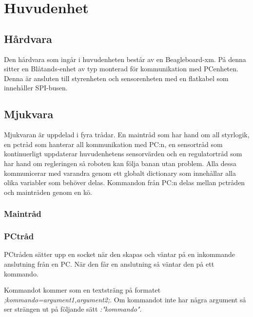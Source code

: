 
\section{Huvudenhet}


\subsection{Hårdvara}
Den hårdvara som ingår i huvudenheten består av en Beagleboard-xm. På denna sitter en Blåtands-enhet av typ  monterad för kommunikation med PCenheten. Denna är ansluten till styrenheten och sensorenheten med en flatkabel som innehåller SPI-busen.

\subsection{Mjukvara}
Mjukvaran är uppdelad i fyra trådar. En maintråd som har hand om all styrlogik, en pctråd som hanterar all kommunikation med PC:n, en sensortråd som kontinuerligt uppdaterar huvudenhetens sensorvärden och en regulatortråd som har hand om regleringen så roboten kan följa banan utan problem. Alla dessa kommunicerar med varandra genom ett globalt dictionary som innehållar alla olika variabler som behöver delas. Kommandon från PC:n delas mellan pctråden och maintråden genom en kö.


\subsubsection{Maintråd}

\subsubsection{PCtråd}
PCtråden sätter upp en socket när den skapas och väntar på en inkommande anslutning från en PC. När den får en anslutning så väntar den på ett kommando.

 Kommandot kommer som en textsträng på formatet \textit{;kommando=argument1,argument2;}. Om kommandot inte har några argument så ser strängen ut på följande sätt \textit{:"kommando"}.

